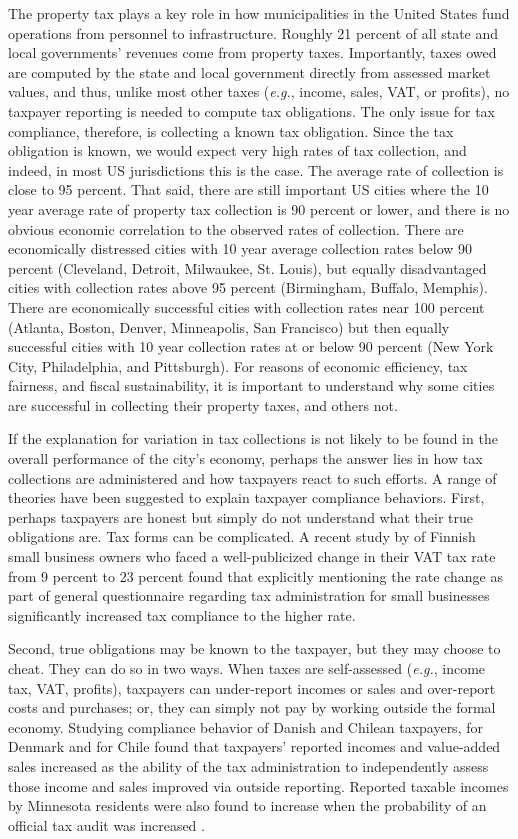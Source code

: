 \documentclass[12pt,titlepage]{article}
\begin{document}
The property tax plays a key role in how municipalities in the
United States fund operations from personnel to infrastructure.
Roughly 21 percent of all state and local governments’ revenues
come from property taxes.  Importantly, taxes owed are computed
by the state and local government directly from assessed market
values, and thus, unlike most other taxes (\textit{e.g.}, income, sales,
VAT, or profits), no taxpayer reporting is needed to compute tax
obligations.  The only issue for tax compliance, therefore, is
collecting a known tax obligation.  Since the tax obligation is
known, we would expect very high rates of tax collection, and
indeed, in most US jurisdictions this is the case.  The average
rate of collection is close to 95 percent.  That said, there are
still important US cities where the 10 year average rate of property
tax collection is 90 percent or lower, and there is no obvious
economic correlation to the observed rates of collection.  There
are economically distressed cities with 10 year average collection
rates below 90 percent (Cleveland, Detroit, Milwaukee, St. Louis),
but equally disadvantaged cities with collection rates above 95
percent (Birmingham, Buffalo, Memphis).   There are economically
successful cities with collection rates near 100 percent (Atlanta,
Boston, Denver, Minneapolis,  San Francisco) but then equally
successful cities with 10 year collection rates at or below 90
percent (New York City, Philadelphia, and Pittsburgh). For
reasons of economic efficiency, tax fairness, and fiscal
sustainability, it is important to understand why some cities are
successful in collecting their property taxes, and others not.  

If the explanation for variation in tax collections is not likely
to be found in the overall performance of the city’s economy,
perhaps the answer lies in how tax collections are administered
and how taxpayers react to such efforts. A range of theories
have been suggested to explain taxpayer compliance behaviors. 
First, perhaps taxpayers are honest but simply do not understand
what their true obligations are. Tax forms can be complicated. 
A recent study by \citet{kosonen} of Finnish small
business owners who faced a well-publicized change in their VAT
tax rate from 9 percent to 23 percent found that explicitly
mentioning the rate change as part of general questionnaire
regarding tax administration for small businesses significantly
increased tax compliance to the higher rate. 

Second, true obligations may be known to the taxpayer, but they may
choose to cheat.  They can do so in two ways.  When taxes are
self-assessed (\textit{e.g.}, income tax, VAT, profits), taxpayers can
under-report incomes or sales and over-report costs and purchases; 
or, they can simply not pay by working outside the formal economy. 
Studying compliance behavior of Danish and Chilean taxpayers, 
\citet{kleven} for Denmark and \citet{pomeranz}
for Chile found that taxpayers’ reported incomes and value-added
sales increased as the ability of the tax administration to
independently assess those income and sales improved via outside
reporting.   Reported taxable incomes by Minnesota residents were
also found to increase when the probability of an official tax audit
was increased \citep{blumenthal}.  
\end{document}
